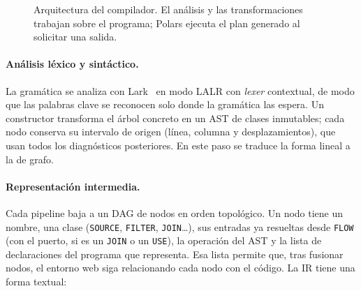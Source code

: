\documentclass[sigplan,screen,nonacm]{acmart}
\begin{document}
\begin{figure}[tbp]
\centering
{}
\caption{Arquitectura del compilador. El análisis y las transformaciones trabajan
sobre el programa; Polars ejecuta el plan generado al solicitar una salida.}
\label{fig:fases}
\end{figure}

\paragraph{Análisis léxico y sintáctico.}
La gramática se analiza con Lark~\cite{lark} en modo LALR con \emph{lexer} contextual, de
modo que las palabras clave se reconocen solo donde la gramática las espera. Un constructor
transforma el árbol concreto en un AST de clases inmutables; cada nodo conserva su intervalo
de origen (línea, columna y desplazamientos), que usan todos los diagnósticos posteriores.
En este paso se traduce la forma lineal a la de grafo.

\paragraph{Representación intermedia.}
Cada pipeline baja a un DAG de nodos en orden topológico. Un nodo tiene un nombre, una
clase (\texttt{SOURCE}, \texttt{FILTER}, \texttt{JOIN}\ldots), sus entradas ya resueltas desde
\texttt{FLOW} (con el puerto, si es un \texttt{JOIN} o un \texttt{USE}), la operación del AST
y la lista de declaraciones del programa que representa. Esa lista permite que, tras fusionar
nodos, el entorno web siga relacionando cada nodo con el código. La IR tiene una forma textual:
\end{document}
